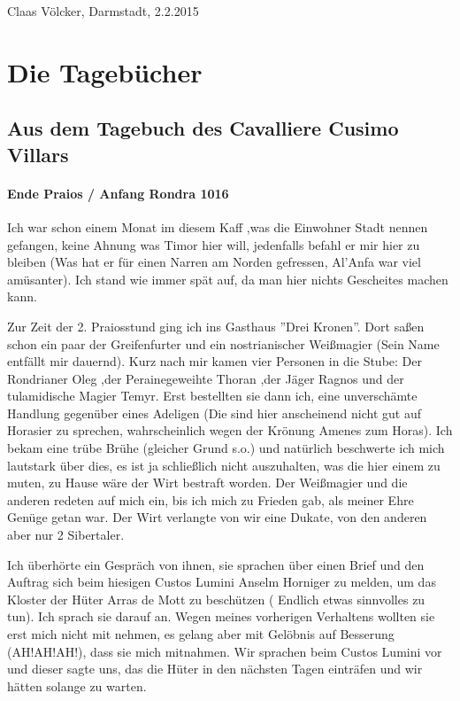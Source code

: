 \begin{flushright}
Claas Völcker, Darmstadt, 2.2.2015
\end{flushright}



\section{Die Tagebücher}


\subsection{Aus dem Tagebuch des Cavalliere Cusimo Villars}

\paragraph{Ende Praios / Anfang Rondra 1016}
Ich war schon einem Monat im diesem Kaff ,was die Einwohner Stadt nennen gefangen, keine Ahnung was Timor hier will, jedenfalls befahl er mir hier zu bleiben (Was hat er für einen Narren am Norden gefressen, Al'Anfa war viel amüsanter).
Ich stand wie immer spät auf, da man hier nichts Gescheites machen kann.

Zur Zeit der 2. Praiosstund ging ich ins Gasthaus ''Drei Kronen''. Dort saßen schon ein paar der Greifenfurter und ein nostrianischer Weißmagier (Sein Name entfällt mir dauernd). Kurz nach mir kamen vier Personen in die Stube: Der Rondrianer Oleg ,der Perainegeweihte Thoran ,der Jäger Ragnos und der tulamidische Magier Temyr. Erst bestellten sie dann ich, eine unverschämte Handlung gegenüber eines Adeligen (Die sind hier anscheinend nicht gut auf Horasier zu sprechen, wahrscheinlich wegen der Krönung Amenes zum Horas). Ich bekam eine trübe Brühe (gleicher Grund s.o.) und natürlich beschwerte ich mich lautstark über dies, es ist ja schließlich nicht auszuhalten, was die hier einem zu muten, zu Hause wäre der Wirt bestraft worden. Der Weißmagier und die anderen redeten auf mich ein, bis ich mich zu Frieden gab, als meiner Ehre Genüge getan war. Der Wirt verlangte von wir eine Dukate, von den anderen aber nur 2 Sibertaler.

Ich überhörte ein Gespräch von ihnen, sie sprachen über einen Brief und den Auftrag sich beim hiesigen Custos Lumini Anselm Horniger zu melden, um das Kloster der Hüter Arras de Mott zu beschützen ( Endlich etwas sinnvolles zu tun). Ich sprach sie darauf an. Wegen meines vorherigen Verhaltens wollten sie erst mich nicht mit nehmen, es gelang aber mit Gelöbnis auf Besserung (AH!AH!AH!), dass sie mich mitnahmen. Wir sprachen beim Custos Lumini vor und dieser sagte uns, das die Hüter in den nächsten Tagen einträfen und wir hätten solange zu warten.


